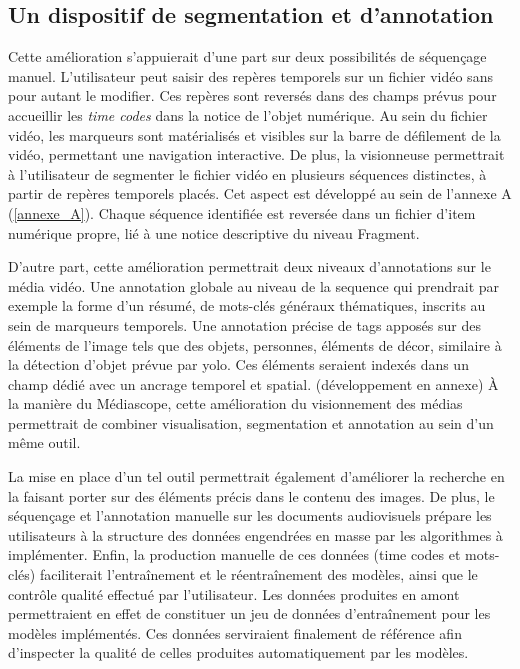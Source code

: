 \subsection{Un dispositif de segmentation et d'annotation}
Cette amélioration s'appuierait d'une part sur deux possibilités de séquençage manuel. L’utilisateur peut saisir des repères temporels sur un fichier vidéo sans pour autant le modifier. Ces repères sont reversés dans des champs prévus pour accueillir les \textit{time codes} dans la notice de l’objet numérique. Au sein du fichier vidéo, les marqueurs sont matérialisés et visibles sur la barre de défilement de la vidéo, permettant une navigation interactive. De plus, la visionneuse permettrait à l’utilisateur de segmenter le fichier vidéo en plusieurs séquences distinctes, à partir de repères temporels placés. Cet aspect est développé au sein de l'annexe A (\ref{annexe_A}). Chaque séquence identifiée est reversée dans un fichier d'item numérique propre, lié à une notice descriptive du niveau Fragment. 

D'autre part, cette amélioration permettrait deux niveaux d'annotations sur le média vidéo. Une annotation globale au niveau de la \gls{sequence} qui prendrait par exemple la forme d'un résumé, de mots-clés généraux thématiques, inscrits au sein de marqueurs temporels. Une annotation précise de tags apposés sur des éléments de l'image tels que des objets, personnes, éléments de décor, similaire à la détection d'objet prévue par \gls{yolo}. Ces éléments seraient indexés dans un champ dédié avec un ancrage temporel et spatial. (développement en annexe)
À la manière du Médiascope, cette amélioration du visionnement des médias permettrait de combiner visualisation, segmentation et annotation au sein d'un même outil. 

La mise en place d'un tel outil permettrait également d'améliorer la recherche en la faisant porter sur des éléments précis dans le contenu des images. De plus, le séquençage et l'annotation manuelle sur les documents audiovisuels prépare les utilisateurs à la structure des données engendrées en masse par les algorithmes à implémenter. Enfin, la production manuelle de ces données (time codes et mots-clés) faciliterait l'entraînement et le réentraînement des modèles, ainsi que le contrôle qualité effectué par l'utilisateur. Les données produites en amont permettraient en effet de constituer un jeu de données d'entraînement pour les modèles implémentés. Ces données serviraient finalement de référence afin d'inspecter la qualité de celles produites automatiquement par les modèles.